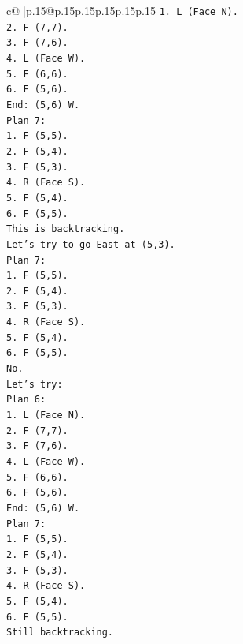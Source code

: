\documentclass{article}
\begin{document}
{\begin{supertabular}{c@{$\;$}|p{.15\linewidth}@{}p{.15\linewidth}p{.15\linewidth}p{.15\linewidth}p{.15\linewidth}p{.15\linewidth}}
{{{\texttt{1. L (Face N).} \\
\texttt{2. F (7,7).} \\
\texttt{3. F (7,6).} \\
\texttt{4. L (Face W).} \\
\texttt{5. F (6,6).} \\
\texttt{6. F (5,6).} \\
\texttt{End: (5,6) W.} \\
\texttt{Plan 7:} \\
\texttt{1. F (5,5).} \\
\texttt{2. F (5,4).} \\
\texttt{3. F (5,3).} \\
\texttt{4. R (Face S).} \\
\texttt{5. F (5,4).} \\
\texttt{6. F (5,5).} \\
\texttt{This is backtracking.} \\
\texttt{Let's try to go East at (5,3).} \\
\texttt{Plan 7:} \\
\texttt{1. F (5,5).} \\
\texttt{2. F (5,4).} \\
\texttt{3. F (5,3).} \\
\texttt{4. R (Face S).} \\
\texttt{5. F (5,4).} \\
\texttt{6. F (5,5).} \\
\texttt{No.} \\
\texttt{Let's try:} \\
\texttt{Plan 6:} \\
\texttt{1. L (Face N).} \\
\texttt{2. F (7,7).} \\
\texttt{3. F (7,6).} \\
\texttt{4. L (Face W).} \\
\texttt{5. F (6,6).} \\
\texttt{6. F (5,6).} \\
\texttt{End: (5,6) W.} \\
\texttt{Plan 7:} \\
\texttt{1. F (5,5).} \\
\texttt{2. F (5,4).} \\
\texttt{3. F (5,3).} \\
\texttt{4. R (Face S).} \\
\texttt{5. F (5,4).} \\
\texttt{6. F (5,5).} \\
\texttt{Still backtracking.} \\
}}}
\end{supertabular}}
\end{document}
